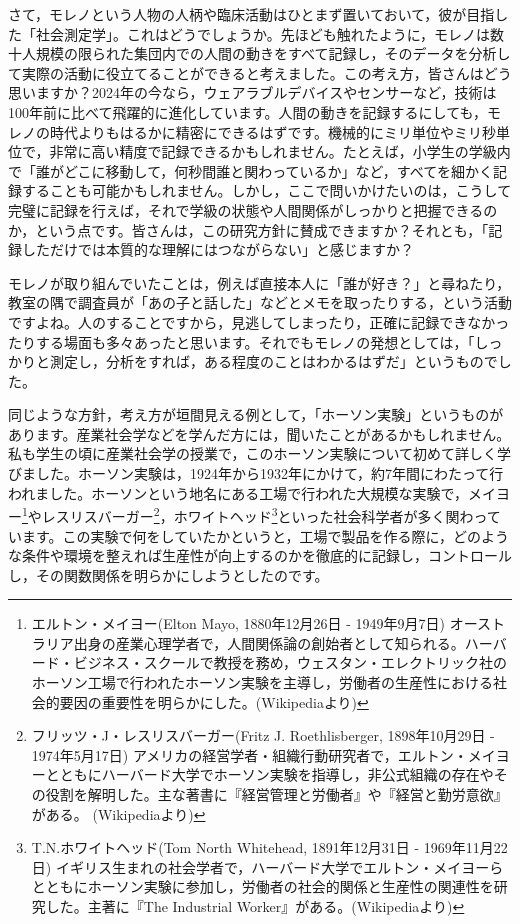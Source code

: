 \documentclass{ltjsbook}
\begin{document}
さて，モレノという人物の人柄や臨床活動はひとまず置いておいて，彼が目指した「社会測定学」。これはどうでしょうか。先ほども触れたように，モレノは数十人規模の限られた集団内での人間の動きをすべて記録し，そのデータを分析して実際の活動に役立てることができると考えました。この考え方，皆さんはどう思いますか？2024年の今なら，ウェアラブルデバイスやセンサーなど，技術は100年前に比べて飛躍的に進化しています。人間の動きを記録するにしても，モレノの時代よりもはるかに精密にできるはずです。機械的にミリ単位やミリ秒単位で，非常に高い精度で記録できるかもしれません。たとえば，小学生の学級内で「誰がどこに移動して，何秒間誰と関わっているか」など，すべてを細かく記録することも可能かもしれません。しかし，ここで問いかけたいのは，こうして完璧に記録を行えば，それで学級の状態や人間関係がしっかりと把握できるのか，という点です。皆さんは，この研究方針に賛成できますか？それとも，「記録しただけでは本質的な理解にはつながらない」と感じますか？

モレノが取り組んでいたことは，例えば直接本人に「誰が好き？」と尋ねたり，教室の隅で調査員が「あの子と話した」などとメモを取ったりする，という活動ですよね。人のすることですから，見逃してしまったり，正確に記録できなかったりする場面も多々あったと思います。それでもモレノの発想としては，「しっかりと測定し，分析をすれば，ある程度のことはわかるはずだ」というものでした。

同じような方針，考え方が垣間見える例として，「ホーソン実験」というものがあります。産業社会学などを学んだ方には，聞いたことがあるかもしれません。私も学生の頃に産業社会学の授業で，このホーソン実験について初めて詳しく学びました。ホーソン実験は，1924年から1932年にかけて，約7年間にわたって行われました。ホーソンという地名にある工場で行われた大規模な実験で，メイヨー\footnote{エルトン・メイヨー(Elton Mayo, 1880年12月26日 - 1949年9月7日)  オーストラリア出身の産業心理学者で，人間関係論の創始者として知られる。ハーバード・ビジネス・スクールで教授を務め，ウェスタン・エレクトリック社のホーソン工場で行われたホーソン実験を主導し，労働者の生産性における社会的要因の重要性を明らかにした。(Wikipediaより)}やレスリスバーガー\footnote{フリッツ・J・レスリスバーガー(Fritz J. Roethlisberger, 1898年10月29日 - 1974年5月17日)  アメリカの経営学者・組織行動研究者で，エルトン・メイヨーとともにハーバード大学でホーソン実験を指導し，非公式組織の存在やその役割を解明した。主な著書に『経営管理と労働者』や『経営と勤労意欲』がある。 (Wikipediaより)}，ホワイトヘッド\footnote{T.N.ホワイトヘッド(Tom North Whitehead, 1891年12月31日 - 1969年11月22日)  イギリス生まれの社会学者で，ハーバード大学でエルトン・メイヨーらとともにホーソン実験に参加し，労働者の社会的関係と生産性の関連性を研究した。主著に『The Industrial Worker』がある。(Wikipediaより)}といった社会科学者が多く関わっています。この実験で何をしていたかというと，工場で製品を作る際に，どのような条件や環境を整えれば生産性が向上するのかを徹底的に記録し，コントロールし，その関数関係を明らかにしようとしたのです。
\end{document}
